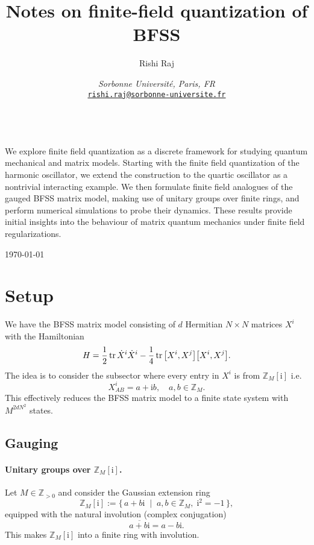 \documentclass[10pt, a4paper]{article}
\title{Notes on finite-field quantization of BFSS}
\author{Rishi Raj}
\date{
    \noindent\textit{Sorbonne Université, Paris, FR}\\[0.2cm]
    \href{mailto:rishiraj.1012exp@gmail.com}{\texttt{rishi.raj@sorbonne-universite.fr}}
}
\newcommand{\ii}{\mathrm{i}}
\numberwithin{equation}{section}
\renewenvironment{abstract}
 {\par\noindent\textbf{\abstractname}\ \ignorespaces\\[1ex]}
 {\par\medskip}
\begin{document}
\thispagestyle{empty}
\maketitle

\begin{abstract}
  We explore finite field quantization as a discrete framework for studying quantum mechanical and matrix models. 
  Starting with the finite field quantization of the harmonic oscillator, we extend the construction to the quartic oscillator as a nontrivial interacting example. 
  We then formulate finite field analogues of the gauged BFSS matrix model, making use of unitary groups over finite rings, and perform numerical simulations to probe their dynamics. 
  These results provide initial insights into the behaviour of matrix quantum mechanics under finite field regularizations.
\end{abstract}

\noindent\today

\tableofcontents

\setlength{\parindent}{1ex}
\setlength{\parskip}{2ex}
\raggedright

\section{Setup}
We have the BFSS matrix model consisting of $d$ Hermitian $N \times N$ matrices $X^i$ with the Hamiltonian
\begin{equation}
  H = \frac{1}{2} \tr \dot{X}^i \dot{X}^i - \frac{1}{4} \tr \comm{X^i}{X^j} \comm{X^i}{X^j}.
\end{equation}
The idea is to consider the subsector where every entry in $X^i$ is from $\mathbb{Z}_M[\ii]$ i.e.
\begin{equation}
  X^i_{A B} = a + \ii b, \quad a, b \in \mathbb{Z}_M.
\end{equation}
This effectively reduces the BFSS matrix model to a finite state system with $M^{2d N^2}$ states.

\subsection{Gauging}
\paragraph{Unitary groups over $\mathbb{Z}_M[\ii]$.} 
Let $M \in \mathbb{Z}_{>0}$ and consider the Gaussian extension ring
\[
  \mathbb{Z}_M[\ii] := \{\, a + b \ii \;\;|\;\; a,b \in \mathbb{Z}_M, \; \ii^2 = -1 \,\},
\]
equipped with the natural involution (complex conjugation) 
\[
  \overline{a+b\ii} = a - b\ii.
\]
This makes $\mathbb{Z}_M[\ii]$ into a finite ring with involution.
\end{document}
